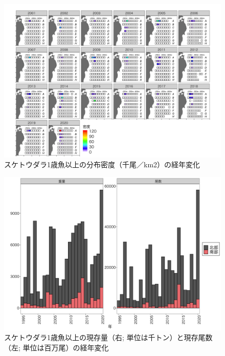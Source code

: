 \documentclass[11pt]{article} %
\begin{document}
\begin{linenumbers}
\begin{figure}[h]
  \centering
  \includegraphics[width = 14cm]{スケトウダラ１＋dens.png}
  \caption{スケトウダラ1歳魚以上の分布密度（千尾／km2）の経年変化}
\end{figure}

\begin{figure}[h]
  \centering
  \includegraphics[width = 14cm]{スケトウダラ１＋trend.png}
  \caption{スケトウダラ1歳魚以上の現存量（右; 単位は千トン）と現存尾数（左; 単位は百万尾）の経年変化}
\end{figure}


\end{linenumbers}
\end{document}
